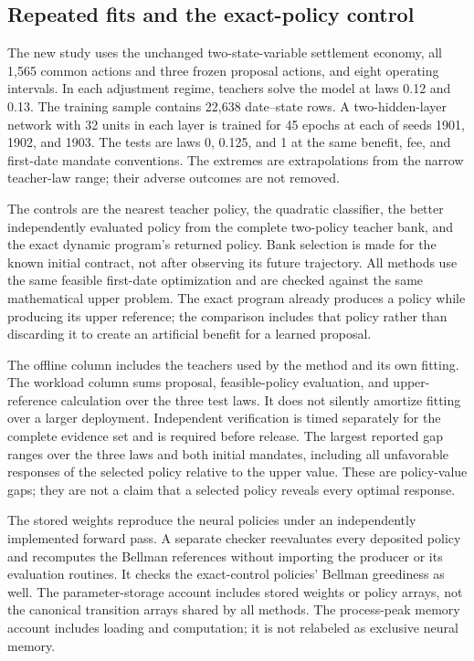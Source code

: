 \subsection{Repeated fits and the exact-policy control}
\label{sec:r19-repeated}
The new study uses the unchanged two-state-variable settlement economy, all 1,565 common actions and three frozen proposal actions, and eight operating intervals. In each adjustment regime, teachers solve the model at laws 0.12 and 0.13. The training sample contains 22,638 date--state rows. A two-hidden-layer network with 32 units in each layer is trained for 45 epochs at each of seeds 1901, 1902, and 1903. The tests are laws 0, 0.125, and 1 at the same benefit, fee, and first-date mandate conventions. The extremes are extrapolations from the narrow teacher-law range; their adverse outcomes are not removed.

The controls are the nearest teacher policy, the quadratic classifier, the better independently evaluated policy from the complete two-policy teacher bank, and the exact dynamic program's returned policy. Bank selection is made for the known initial contract, not after observing its future trajectory. All methods use the same feasible first-date optimization and are checked against the same mathematical upper problem. The exact program already produces a policy while producing its upper reference; the comparison includes that policy rather than discarding it to create an artificial benefit for a learned proposal.



The offline column includes the teachers used by the method and its own fitting. The workload column sums proposal, feasible-policy evaluation, and upper-reference calculation over the three test laws. It does not silently amortize fitting over a larger deployment. Independent verification is timed separately for the complete evidence set and is required before release. The largest reported gap ranges over the three laws and both initial mandates, including all unfavorable responses of the selected policy relative to the upper value. These are policy-value gaps; they are not a claim that a selected policy reveals every optimal response.

The stored weights reproduce the neural policies under an independently implemented forward pass. A separate checker reevaluates every deposited policy and recomputes the Bellman references without importing the producer or its evaluation routines. It checks the exact-control policies' Bellman greediness as well. The parameter-storage account includes stored weights or policy arrays, not the canonical transition arrays shared by all methods. The process-peak memory account includes loading and computation; it is not relabeled as exclusive neural memory.

